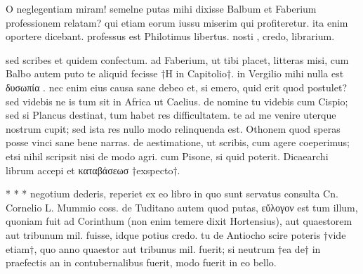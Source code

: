 


 O neglegentiam miram! semelne putas mihi dixisse Balbum et Faberium professionem relatam? qui etiam eorum iussu miserim qui profiteretur. ita enim oportere dicebant. professus est Philotimus libertus. nosti , credo, librarium.

 sed scribes et quidem confectum. ad Faberium, ut tibi placet, litteras misi, cum Balbo autem puto te aliquid fecisse †H in Capitolio†. in Vergilio mihi nulla est δυσωπία . nec enim eius causa sane debeo et, si emero, quid erit quod postulet? sed videbis ne is tum sit in Africa ut Caelius. de nomine tu videbis cum Cispio; sed si Plancus destinat, tum habet res difficultatem. te ad me venire uterque nostrum cupit; sed ista res nullo modo relinquenda est. Othonem quod speras posse vinci sane bene narras. de aestimatione, ut scribis, cum agere coeperimus; etsi nihil scripsit nisi de modo agri. cum Pisone, si quid poterit. Dicaearchi librum accepi et καταβάσεωσ †exspecto†.

 * * * negotium dederis, reperiet ex eo libro in quo sunt servatus consulta Cn. Cornelio L. Mummio coss. de Tuditano autem quod putas, εὔλογον est tum illum, quoniam fuit ad Corinthum (non enim temere dixit Hortensius), aut quaestorem aut tribunum mil. fuisse, idque potius credo. tu de Antiocho scire poteris †vide etiam†, quo anno quaestor aut tribunus mil. fuerit; si neutrum †ea de† in praefectis an in contubernalibus fuerit, modo fuerit in eo bello.
